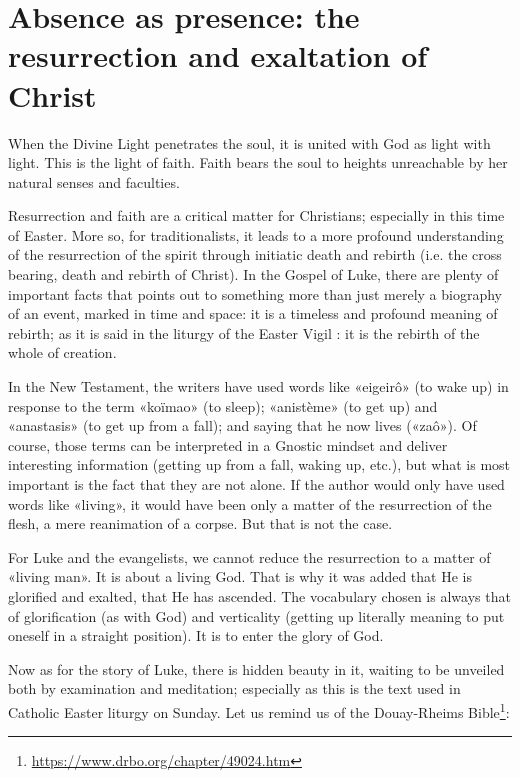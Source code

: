 \section[Absence as presence]{Absence as presence: the resurrection and exaltation of Christ}

\begin{quotex}
When the Divine Light penetrates the soul, it is united with God as light with light. This is the light of faith. Faith bears the soul to heights unreachable by her natural senses and faculties.

\end{quotex}

Resurrection and faith are a critical matter for Christians; especially in this time of Easter. More so, for traditionalists, it leads to a more profound understanding of the resurrection of the spirit through initiatic death and rebirth (i.e. the cross bearing, death and rebirth of Christ). In the Gospel of Luke, there are plenty of important facts that points out to something more than just merely a biography of an event, marked in time and space: it is a timeless and profound meaning of rebirth; as it is said in the liturgy of the Easter Vigil : it is the rebirth of the whole of creation.

In the New Testament, the writers have used words like «eigeirô» (to wake up) in response to the term «koïmao» (to sleep); «anistème» (to get up) and «anastasis» (to get up from a fall); and saying that he now lives («zaô»). Of course, those terms can be interpreted in a Gnostic mindset and deliver interesting information (getting up from a fall, waking up, etc.), but what is most important is the fact that they are not alone. If the author would only have used words like «living», it would have been only a matter of the resurrection of the flesh, a mere reanimation of a corpse. But that is not the case.

For Luke and the evangelists, we cannot reduce the resurrection to a matter of «living man». It is about a living God. That is why it was added that He is glorified and exalted, that He has ascended. The vocabulary chosen is always that of glorification (as with God) and verticality (getting up literally meaning to put oneself in a straight position). It is to enter the glory of God.

Now as for the story of Luke, there is hidden beauty in it, waiting to be unveiled both by examination and meditation; especially as this is the text used in Catholic Easter liturgy on Sunday. Let us remind us of the Douay-Rheims Bible\footnote{\url{https://www.drbo.org/chapter/49024.htm}}:

